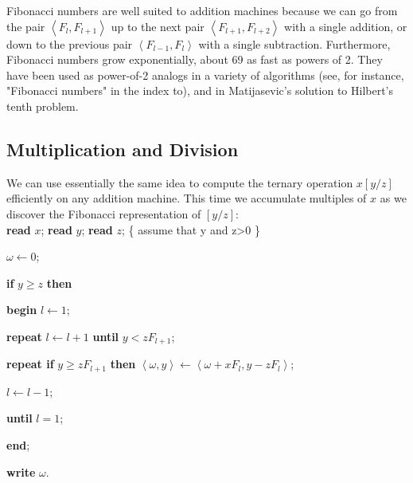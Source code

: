 \documentclass{article}
\begin{document}
\begin{multicols}{3}
\hspace{.5cm}Fibonacci numbers are well suited to addition machines because we can go from the pair $\left \langle F_{l},F_{l+1} \right \rangle$ up to the next pair $\left \langle F_{l+1},F_{l+2} \right \rangle$ with a single addition, or down to the previous pair $\left \langle F_{l-1},F_{l} \right \rangle$ with a single subtraction. Furthermore, Fibonacci numbers grow exponentially, about 69 \; as fast as powers of 2. They have been used as power-of-2 analogs in a variety of algorithms (see, for instance, "Fibonacci numbers" in the index to), and in Matijasevic's solution to Hilbert's tenth problem.
\noindent
\begin{center}
  \noindent
  \colorbox{marronrp3}{
    \begin{minipage}[t]{.96\linewidth}
    \vspace{.2cm}
    \section*{Multiplication and Division}
    We can use essentially the same idea to compute the ternary operation $x[y/z]$ efficiently on any addition machine. This time we accumulate multiples of $x$ as we discover the Fibonacci representation of $[y/z]$:\\
    
    \hspace {.5cm} \textbf{read} $x$; \textbf{read} $y$; \textbf{read} $z$; \left \{ assume\; that y\; and\; z>0  \right \} 
    
    \hspace {.5cm} $\omega \leftarrow 0$;
    
    \hspace {.5cm} \textbf{if} $y\geq z$ \textbf{then}
    
    \hspace {1cm} \textbf{begin} $l\leftarrow 1$;
    
    \hspace {1cm} \textbf{repeat} $l\leftarrow l+1$ \textbf{until} $y< zF_{l+1}$;
    
    \hspace {1cm} \textbf{repeat if} $y\geq zF_{l+1}$ \textbf{then} $\left \langle \omega,y \right \rangle\leftarrow \left \langle \omega+xF_{l},y-zF_{l} \right \rangle$;
    
    \hspace {1.5cm} $l\leftarrow l-1$;
    
    \hspace {1cm} \textbf{until} $l=1$;
    
    \hspace {1cm} \textbf{end};
    
    \hspace {.5cm} \textbf{write} $\omega$.
    \vspace {.2cm} 
    \end{minipage}
  }
\end{center}





\end{multicols}
\end{document}
